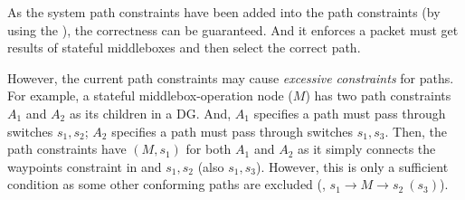 As the system path constraints have been added into the path constraints (by using the ), the correctness can be guaranteed. And it enforces a packet must get results of stateful middleboxes and then select the correct path.

%
%
%
%

However, the current path constraints may cause \emph{excessive constraints} for paths. For example, a stateful middlebox-operation node ($M$) has two path constraints $A_1$ and $A_2$ as its children in a DG. And, $A_1$ specifies a path must pass through switches $s_1, s_2$; $A_2$ specifies a path must pass through switches $s_1, s_3$. Then, the path constraints have $(M, s_1)$ for both $A_1$ and $A_2$ as it simply connects the waypoints constraint in  and $s_1, s_2$ (also $s_1, s_3$). However, this is only a sufficient condition as some other conforming paths are excluded (\eg, $s_1 \rightarrow M \rightarrow s_2\ (s_3)$).

